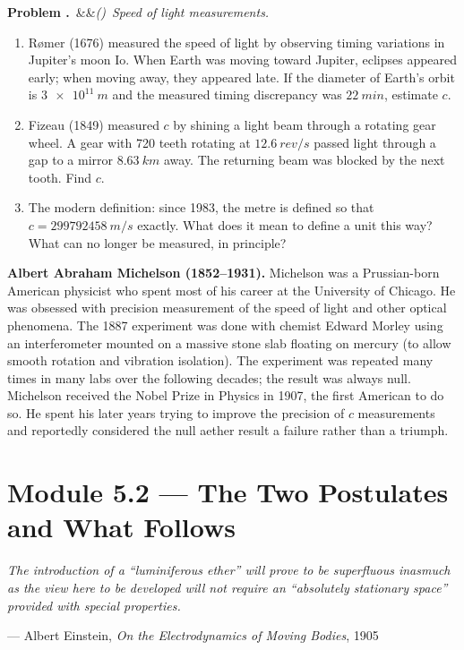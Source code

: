 \documentclass[12pt, a4paper, twoside]{book}
\newcounter{problem}[chapter]
\newcommand{\problem}[1][]{\refstepcounter{problem}\medskip\noindent
  \textcolor{accent}{\textbf{Problem \theproblem.}}\ \ifx&#1&\else\textit{(#1)}\ \fi}
\begin{document}
\begin{explobox}
\problem \textit{Speed of light measurements.}
\begin{enumerate}[label=(\alph*)]
  \item R\o{}mer (1676) measured the speed of light by observing timing variations in Jupiter's moon Io. When Earth was moving toward Jupiter, eclipses appeared early; when moving away, they appeared late. If the diameter of Earth's orbit is $\SI{3e11}{m}$ and the measured timing discrepancy was $\SI{22}{min}$, estimate $c$.
  \item Fizeau (1849) measured $c$ by shining a light beam through a rotating gear wheel. A gear with 720 teeth rotating at $\SI{12.6}{rev/s}$ passed light through a gap to a mirror $\SI{8.63}{km}$ away. The returning beam was blocked by the next tooth. Find $c$.
  \item The modern definition: since 1983, the metre is defined so that $c = \SI{299792458}{m/s}$ exactly. What does it mean to define a unit this way? What can no longer be measured, in principle?
\end{enumerate}
\end{explobox}

\begin{historybox}
\textbf{Albert Abraham Michelson (1852--1931).} Michelson was a Prussian-born American physicist who spent most of his career at the University of Chicago. He was obsessed with precision measurement of the speed of light and other optical phenomena. The 1887 experiment was done with chemist Edward Morley using an interferometer mounted on a massive stone slab floating on mercury (to allow smooth rotation and vibration isolation). The experiment was repeated many times in many labs over the following decades; the result was always null. Michelson received the Nobel Prize in Physics in 1907, the first American to do so. He spent his later years trying to improve the precision of $c$ measurements and reportedly considered the null aether result a failure rather than a triumph.
\end{historybox}

\section{Module 5.2 — The Two Postulates and What Follows}
\label{sec:postulates}

\epigraph{\itshape
  The introduction of a ``luminiferous ether'' will prove to be superfluous
  inasmuch as the view here to be developed will not require an ``absolutely
  stationary space'' provided with special properties.
}{--- Albert Einstein, \textit{On the Electrodynamics of Moving Bodies}, 1905}
\end{document}
